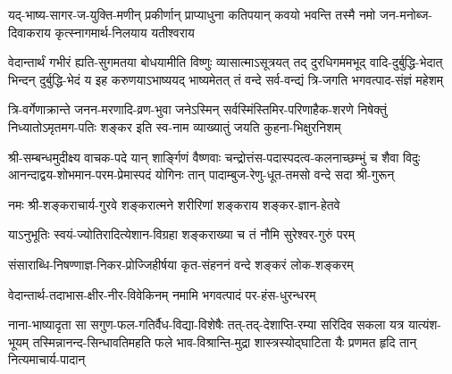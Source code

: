 
\fourlineindentedshloka
{यद्-भाष्य-सागर-ज-युक्ति-मणीन् प्रकीर्णान्}
{प्राप्याधुना कतिपयान् कवयो भवन्ति}
{तस्मै नमो जन-मनोब्ज-दिवाकराय}
{कृत्स्नागमार्थ-निलयाय यतीश्वराय}


\fourlineindentedshloka
{वेदान्तार्थं गभीरं ह्यति-सुगमतया बोधयामीति विष्णुः}
{व्यासात्माऽसूत्रयत् तद् दुरधिगममभूद् वादि-दुर्बुद्धि-भेदात्}
{भिन्दन् दुर्बुद्धि-भेदं य इह करुणयाऽभाष्ययद् भाष्यमेतत्}
{तं वन्दे सर्व-वन्द्यं त्रि-जगति भगवत्पाद-संज्ञं महेशम्}


\fourlineindentedshloka
{त्रि-वर्गेणाक्रान्ते जनन-मरणादि-व्रण-भुवा}
{जनेऽस्मिन् सर्वस्मिंस्तिमिर-परिणाहैक-शरणे}
{निषेक्तुं निध्यातोऽमृतमग-पतिः शङ्कर इति}
{स्व-नाम व्याख्यातुं जयति कुहना-भिक्षुरनिशम्}


\fourlineindentedshloka
{श्री-सम्बन्धमुदीक्ष्य वाचक-पदे यान् शार्ङ्गिणं वैष्णवाः}
{चन्द्रोत्तंस-पदास्पदत्व-कलनाच्छम्भुं च शैवा विदुः}
{आनन्दाद्वय-शोभमान-परम-प्रेमास्पदं योगिनः}
{तान् पादाम्बुज-रेणु-धूत-तमसो वन्दे सदा श्री-गुरून्}


\twolineshloka
{नमः श्री-शङ्कराचार्य-गुरवे शङ्करात्मने}
{शरीरिणां शङ्कराय शङ्कर-ज्ञान-हेतवे}


\twolineshloka
{याऽनुभूतिः स्वयं-ज्योतिरादित्येशान-विग्रहा}
{शङ्कराख्या च तं नौमि सुरेश्वर-गुरुं परम्}


\twolineshloka
{संसाराब्धि-निषण्णाज्ञ-निकर-प्रोज्जिहीर्षया}
{कृत-संहननं वन्दे शङ्करं लोक-शङ्करम्}


\twolineshloka
{वेदान्तार्थ-तदाभास-क्षीर-नीर-विवेकिनम्}
{नमामि भगवत्पादं पर-हंस-धुरन्धरम्}


\fourlineindentedshloka
{नाना-भाष्यादृता सा सगुण-फल-गतिर्वैध-विद्या-विशेषैः}
{तत्-तद्-देशाप्ति-रम्या सरिदिव सकला यत्र यात्यंश-भूयम्}
{तस्मिन्नानन्द-सिन्धावतिमहति फले भाव-विश्रान्ति-मुद्रा}
{शास्त्रस्योद्घाटिता यैः प्रणमत हृदि तान् नित्यमाचार्य-पादान्}

